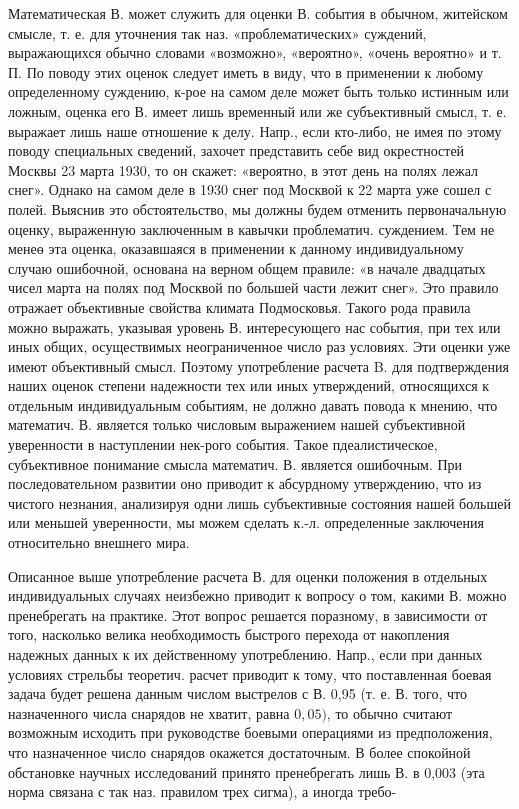 \documentclass[10pt]{article}
\begin{document}
Математическая В. может служить для оценки В. события в обычном, житейском смысле, т. е. для уточнения так наз. «проблематических» суждений, выражающихся обычно словами «возможно», «вероятно», «очень вероятно» и т. П. По поводу этих оценок следует иметь в виду, что в применении к любому определенному суждению, к-рое на самом деле может быть только истинным или ложным, оценка его В. имеет лишь временный или же субъективный смысл, т. е. выражает лишь наше отношение к делу. Напр., если кто-либо, не имея по этому поводу специальных сведений, захочет представить себе вид окрестностей Москвы 23 марта 1930, то он скажет: «вероятно, в этот день на полях лежал снег». Однако на самом деле в 1930 снег под Москвой к 22 марта уже сошел с полей. Выяснив это обстоятельство, мы должны будем отменить первоначальную оценку, выраженную заключенным в кавычки проблематич. суждением. Тем не менеө эта оценка, оказавшаяся в применении к данному индивидуальному случаю ошибочной, основана на верном общем правиле: «в начале двадцатых чисел марта на полях под Москвой по большей части лежит снег». Это правило отражает объективные свойства климата Подмосковья. Такого рода правила можно выражать, указывая уровень В. интересующего нас события, при тех или иных общих, осуществимых неограниченное число раз условиях. Эти оценки уже имеют объективный смысл. Поэтому употребление расчета B. для подтверждения наших оценок степени надежности тех или иных утверждений, относящихся к отдельным индивидуальным событиям, не должно давать повода к мнению, что математич. В. является только числовым выражением нашей субъективной уверенности в наступлении нек-рого события. Такое пдеалистическое, субъективное понимание смысла математич. В. является ошибочным. При последовательном развитии оно приводит к абсурдному утверждению, что из чистого незнания, анализируя одни лишь субъективные состояния нашей большей или меньшей уверенности, мы можем сделать к.-л. определенные заключения относительно внешнего мира.



Описанное выше употребление расчета В. для оценки положения в отдельных индивидуальных случаях неизбежно приводит к вопросу о том, какими В. можно пренебрегать на практике. Этот вопрос решается поразному, в зависимости от того, насколько велика необходимость быстрого перехода от накопления надежных данных к их действенному употреблению. Напр., если при данных условиях стрельбы теоретич. расчет приводит к тому, что поставленная боевая задача будет решена данным числом выстрелов с В. 0,95 (т. е. В. того, что назначенного числа снарядов не хватит, равна $0,05)$, то обычно считают возможным исходить при руководстве боевыми операциями из предположения, что назначенное число снарядов окажется достаточным. В более спокойной обстановке научных исследований принято пренебрегать лишь В. в 0,003 (эта норма связана с так наз. правилом трех сигма), а иногда требо-
\end{document}
